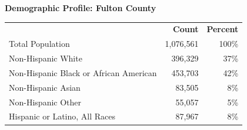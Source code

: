 \documentclass{article}
\begin{document}
\begin{center}
\LARGE{\textbf{Demographic Profile: Fulton County}}\\
\end{center}


\begin{tabular}{ p{4in} r r }

& \textbf{Count} & \textbf{Percent} \\
Total Population & 1,076,561 & 100\% \\ 
Non-Hispanic White & 396,329 & 37\% \\
Non-Hispanic Black or African American & 453,703 & 42\% \\
Non-Hispanic Asian & 83,505 & 8\% \\
Non-Hispanic Other & 55,057 & 5\% \\
Hispanic or Latino, All Races & 87,967 & 8\%\\

\end{tabular}
\end{document}
